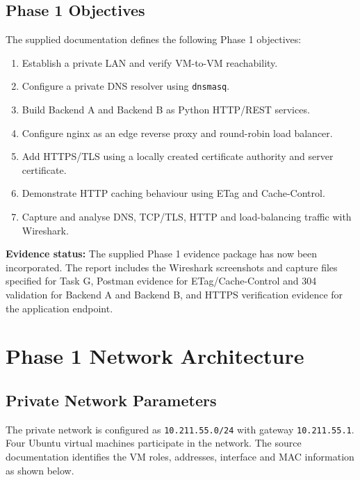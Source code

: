 \documentclass[12pt,a4paper]{article}
\newcommand{\statusbox}[2]{%
\begin{tcolorbox}[colback=lightgray,colframe=bordergray,boxrule=0.5pt]
\textbf{#1:} #2
\end{tcolorbox}}
\begin{document}
\subsection{Phase 1 Objectives}
The supplied documentation defines the following Phase 1 objectives:
\begin{enumerate}
  \item Establish a private LAN and verify VM-to-VM reachability.
  \item Configure a private DNS resolver using \texttt{dnsmasq}.
  \item Build Backend A and Backend B as Python HTTP/REST services.
  \item Configure nginx as an edge reverse proxy and round-robin load balancer.
  \item Add HTTPS/TLS using a locally created certificate authority and server certificate.
  \item Demonstrate HTTP caching behaviour using ETag and Cache-Control.
  \item Capture and analyse DNS, TCP/TLS, HTTP and load-balancing traffic with Wireshark.
\end{enumerate}

\statusbox{Evidence status}{The supplied Phase 1 evidence package has now been incorporated. The report includes the Wireshark screenshots and capture files specified for Task G, Postman evidence for ETag/Cache-Control and 304 validation for Backend A and Backend B, and HTTPS verification evidence for the application endpoint.}

\section{Phase 1 Network Architecture}

\subsection{Private Network Parameters}
The private network is configured as \texttt{10.211.55.0/24} with gateway \texttt{10.211.55.1}. Four Ubuntu virtual machines participate in the network. The source documentation identifies the VM roles, addresses, interface and MAC information as shown below.
\end{document}
